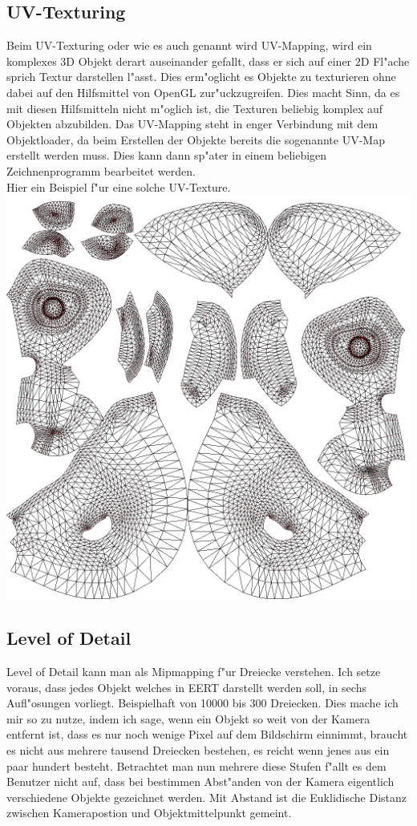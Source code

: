 \documentclass[a4paper,titlepage]{article}
\begin{document}
\subsection{UV-Texturing}
Beim UV-Texturing oder wie es auch genannt wird UV-Mapping, wird ein komplexes 3D Objekt derart auseinander 
gefallt, dass er sich auf einer 2D Fl"ache sprich Textur darstellen l"asst. Dies erm"oglicht es Objekte zu 
texturieren ohne dabei auf den Hilfsmittel von OpenGL zur"uckzugreifen. Dies macht Sinn, da es mit diesen 
Hilfsmitteln nicht m"oglich ist, die Texturen beliebig komplex auf Objekten abzubilden. Das UV-Mapping steht 
in enger Verbindung mit dem Objektloader, da beim Erstellen der Objekte bereits die sogenannte UV-Map erstellt 
werden muss. Dies kann dann sp"ater in einem beliebigen Zeichnenprogramm bearbeitet werden.\\

Hier ein Beispiel f"ur eine solche UV-Texture.\\
\includegraphics[width = 1.0\textwidth]{t10138u_Suzanne.png}\\

\subsection{Level of Detail}
Level of Detail kann man als Mipmapping f"ur Dreiecke verstehen. Ich setze voraus, dass jedes Objekt welches 
in EERT darstellt werden soll, in sechs Aufl"osungen vorliegt. Beispielhaft von 10000 bis 300 Dreiecken. Dies 
mache ich mir so zu nutze, indem ich sage, wenn ein Objekt so weit von der Kamera entfernt ist, dass es nur noch 
wenige Pixel auf dem Bildschirm einnimmt, braucht es nicht aus mehrere tausend Dreiecken bestehen, es reicht 
wenn jenes aus ein paar hundert besteht.
Betrachtet man nun mehrere diese Stufen f"allt es dem Benutzer nicht auf, dass bei bestimmen Abst"anden von 
der Kamera eigentlich verschiedene Objekte gezeichnet werden. Mit Abstand ist die Euklidische Distanz zwischen
Kamerapostion und Objektmittelpunkt gemeint.
\end{document}
